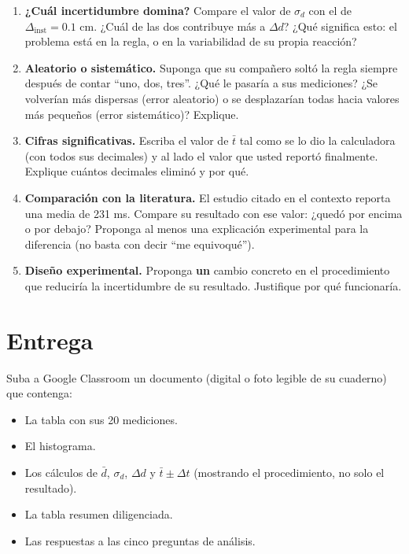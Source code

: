 \documentclass[11pt, letterpaper]{article}
\begin{document}
	\begin{enumerate}
		\item \textbf{¿Cuál incertidumbre domina?} Compare el valor de $\sigma_d$ con el de
		$\Delta_{\text{inst}} = 0.1$ cm. ¿Cuál de las dos contribuye más a $\Delta d$?
		¿Qué significa esto: el problema está en la regla, o en la variabilidad de su
		propia reacción?
		
		\item \textbf{Aleatorio o sistemático.} Suponga que su compañero soltó la regla
		siempre después de contar ``uno, dos, tres''. ¿Qué le pasaría a sus mediciones?
		¿Se volverían más dispersas (error aleatorio) o se desplazarían todas hacia
		valores más pequeños (error sistemático)? Explique.
		
		\item \textbf{Cifras significativas.} Escriba el valor de $\bar{t}$ tal como
		se lo dio la calculadora (con todos sus decimales) y al lado el valor que
		usted reportó finalmente. Explique cuántos decimales eliminó y por qué.
		
		\item \textbf{Comparación con la literatura.} El estudio citado en el contexto
		reporta una media de 231 ms. Compare su resultado con ese valor: ¿quedó por
		encima o por debajo? Proponga al menos una explicación experimental para la
		diferencia (no basta con decir ``me equivoqué'').
		
		\item \textbf{Diseño experimental.} Proponga \textbf{un} cambio concreto en el
		procedimiento que reduciría la incertidumbre de su resultado. Justifique por qué
		funcionaría.
	\end{enumerate}
	
	\section{Entrega}
	
	Suba a Google Classroom un documento (digital o foto legible de su cuaderno) que contenga:
	
	\begin{itemize}
		\item La tabla con sus 20 mediciones.
		\item El histograma.
		\item Los cálculos de $\bar{d}$, $\sigma_d$, $\Delta d$ y $\bar{t} \pm \Delta t$
		(mostrando el procedimiento, no solo el resultado).
		\item La tabla resumen diligenciada.
		\item Las respuestas a las cinco preguntas de análisis.
	\end{itemize}
	
\end{document}
